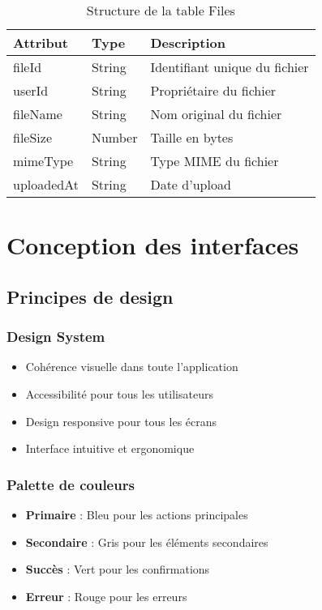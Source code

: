 \begin{table}[H]
\centering
\caption{Structure de la table Files}
\begin{tabular}{|l|l|l|}
\hline
\textbf{Attribut} & \textbf{Type} & \textbf{Description} \\
\hline
fileId & String & Identifiant unique du fichier \\
\hline
userId & String & Propriétaire du fichier \\
\hline
fileName & String & Nom original du fichier \\
\hline
fileSize & Number & Taille en bytes \\
\hline
mimeType & String & Type MIME du fichier \\
\hline
uploadedAt & String & Date d'upload \\
\hline
\end{tabular}
\end{table}

\section{Conception des interfaces}

\subsection{Principes de design}

\subsubsection{Design System}

\begin{itemize}
    \item Cohérence visuelle dans toute l'application
    \item Accessibilité pour tous les utilisateurs
    \item Design responsive pour tous les écrans
    \item Interface intuitive et ergonomique
\end{itemize}

\subsubsection{Palette de couleurs}

\begin{itemize}
    \item \textbf{Primaire} : Bleu pour les actions principales
    \item \textbf{Secondaire} : Gris pour les éléments secondaires
    \item \textbf{Succès} : Vert pour les confirmations
    \item \textbf{Erreur} : Rouge pour les erreurs
\end{itemize}

